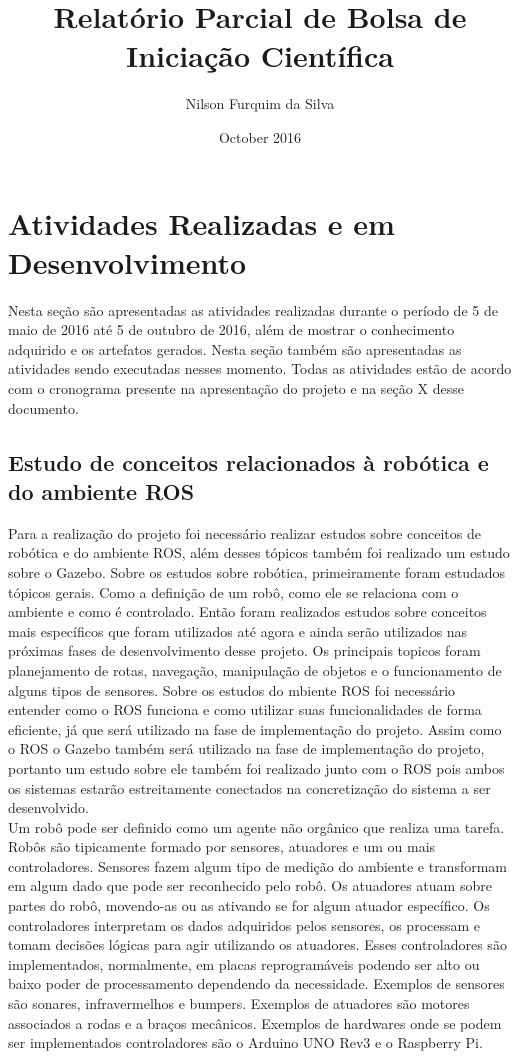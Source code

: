 \documentclass{article}
\title{Relatório Parcial de Bolsa de Iniciação Científica}
\date{October 2016}
\author{Nilson Furquim da Silva}
\begin{document}
\maketitle
\chapter{Atividades Realizadas e em Desenvolvimento}
Nesta seção são apresentadas as atividades realizadas durante o período de 5 de maio de 2016 até 5 de outubro de 2016, além de mostrar o conhecimento adquirido e os artefatos gerados. Nesta seção também são apresentadas as atividades sendo executadas nesses momento. Todas as atividades estão de acordo com o cronograma presente na apresentação do projeto e na seção X desse documento.   
\section{Estudo de conceitos relacionados à robótica e do ambiente ROS}
Para a realização do projeto foi necessário realizar estudos sobre conceitos de robótica e do ambiente ROS, além desses tópicos também foi realizado um estudo sobre o Gazebo. Sobre os estudos sobre robótica, primeiramente foram estudados tópicos gerais. Como a definição de um robô, como ele se relaciona com o ambiente e como é controlado. Então foram realizados estudos sobre conceitos mais específicos que foram utilizados até agora e ainda serão utilizados nas próximas fases de desenvolvimento desse projeto. Os principais topicos foram planejamento de rotas, navegação, manipulação de objetos e o funcionamento de alguns tipos de sensores. Sobre os estudos do mbiente ROS foi necessário entender como o ROS funciona e como utilizar suas funcionalidades de forma eficiente, já que será utilizado na fase de implementação do projeto. Assim como o ROS o Gazebo também será utilizado na fase de implementação do projeto, portanto um estudo sobre ele também foi realizado junto com o ROS pois ambos os sistemas estarão estreitamente conectados na concretização do sistema a ser desenvolvido.\\
Um robô pode ser definido como um agente não orgânico que realiza uma tarefa. Robôs são tipicamente formado por sensores, atuadores e um ou mais controladores. Sensores fazem algum tipo de medição do ambiente e transformam em algum dado que pode ser reconhecido pelo robô. Os atuadores atuam sobre 
partes do robô, movendo-as ou as ativando se for algum atuador específico. Os controladores interpretam os dados adquiridos pelos sensores, os processam e tomam decisões lógicas para agir utilizando os atuadores. Esses controladores são implementados, normalmente, em placas reprogramáveis podendo ser alto ou baixo poder de processamento dependendo da necessidade. Exemplos de sensores são sonares, infravermelhos e bumpers. Exemplos de atuadores são motores associados a rodas e a braços mecânicos. Exemplos de hardwares onde se podem ser implementados controladores são o Arduino UNO Rev3 e o Raspberry Pi.\\
\end{document}
